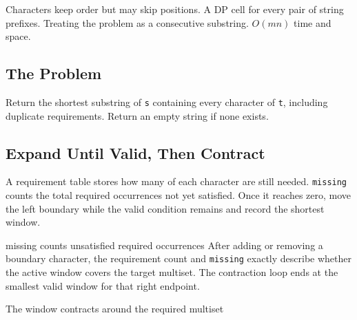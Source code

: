 \chaptercheckpoint
  {Characters keep order but may skip positions.}
  {A DP cell for every pair of string prefixes.}
  {Treating the problem as a consecutive substring.}
  {$O(mn)$ time and space.}



\subsection{The Problem}
Return the shortest substring of \texttt{s} containing every character of
\texttt{t}, including duplicate requirements. Return an empty string if none
exists.

\subsection{Expand Until Valid, Then Contract}
A requirement table stores how many of each character are still needed.
\texttt{missing} counts the total required occurrences not yet satisfied.
Once it reaches zero, move the left boundary while the valid condition remains and record
the shortest window.

\begin{invariantbox}{missing counts unsatisfied required occurrences}
After adding or removing a boundary character, the requirement count and
\texttt{missing} exactly describe whether the active window covers the target
multiset. The contraction loop ends at the smallest valid window for that
right endpoint.
\end{invariantbox}

\begin{visualbox}{The window contracts around the required multiset}
\centering
{}
\end{visualbox}

